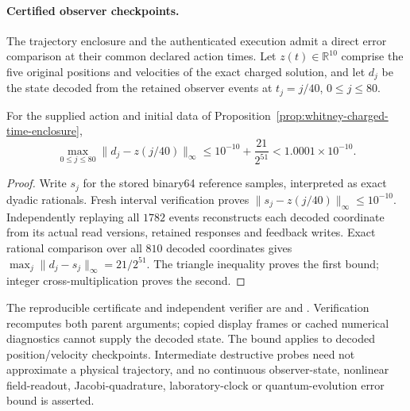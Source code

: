 \paragraph{Certified observer checkpoints.}
The trajectory enclosure and the authenticated execution admit a direct
error comparison at their common declared action times. Let $z(t)\in
\mathbb R^{10}$ comprise the five original positions and velocities of the
exact charged solution, and let $d_j$ be the state decoded from the
retained observer events at $t_j=j/40$, $0\leq j\leq80$.

\begin{proposition}
\label{cor:whitney-charged-checkpoint}
For the supplied action and initial data of
Proposition~\ref{prop:whitney-charged-time-enclosure},
\[
 \max_{0\leq j\leq80}\|d_j-z(j/40)\|_\infty
 \leq 10^{-10}+\frac{21}{2^{51}}
 <1.0001\times10^{-10}.
\]
\end{proposition}
\begin{proof}
Write $s_j$ for the stored binary64 reference samples, interpreted as exact
dyadic rationals. Fresh interval verification proves
$\|s_j-z(j/40)\|_\infty\leq10^{-10}$. Independently replaying all
$1782$ events reconstructs each decoded coordinate from its actual read
versions, retained responses and feedback writes. Exact rational comparison
over all $810$ decoded coordinates gives
$\max_j\|d_j-s_j\|_\infty=21/2^{51}$. The triangle inequality proves
the first bound; integer cross-multiplication proves the second.
\end{proof}

The reproducible certificate and independent verifier are
and .
Verification recomputes both parent arguments; copied display frames or
cached numerical diagnostics cannot supply the decoded state. The bound
applies to decoded position/velocity checkpoints. Intermediate destructive
probes need not approximate a physical trajectory, and no continuous
observer-state, nonlinear field-readout, Jacobi-quadrature, laboratory-clock
or quantum-evolution error bound is asserted.
